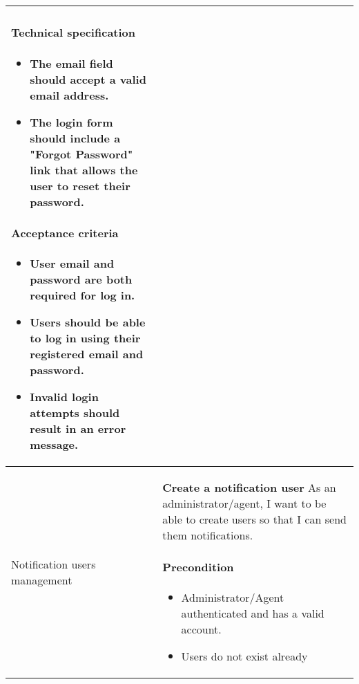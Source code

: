 \begin{longtable}{ | m{} | m{} | }
    \paragraph*{Technical specification} \mbox{} \newline
    \begin{itemize}
        \item The email field should accept a valid email address.
        \item The login form should include a "Forgot Password" link that allows the user to reset their password.

    \end{itemize}
    \paragraph*{Acceptance criteria} \mbox{} \newline
    \begin{itemize}
        \item User email and password are both required for log in.
        \item Users should be able to log in using their registered email and password.
        \item Invalid login attempts should result in an error message.
    \end{itemize}                                                                                                                                                                                        \\
    \hline
    Notification users management                      & \textbf{Create a notification user} \newline As an administrator/agent, I want to be able to create users so that I can send them notifications.
    \paragraph*{Precondition} \mbox{} \newline
    \begin{itemize}
        \item Administrator/Agent authenticated and has a valid account.
        \item Users do not exist already
    \end{itemize}

\end{longtable}
